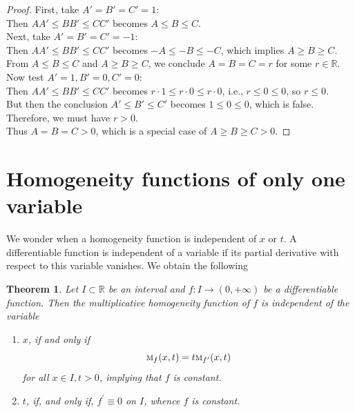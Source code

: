 \documentclass{amsart}
\newtheorem{theorem}{Theorem}
\theoremstyle{plain}
\numberwithin{equation}{section}
\newcommand{\mh}{\textsc{m}}
\newcommand{\R}{{\mathbb{R}}}
\begin{document}
\begin{proof}
First, take \(A' = B' = C' = 1\): \\
Then \(A A' \le B B' \le C C'\) becomes \(A \le B \le C\). \\

Next, take \(A' = B' = C' = -1\): \\
Then \(A A' \le B B' \le C C'\) becomes \(-A \le -B \le -C\), which implies \(A \ge B \ge C\). \\

From \(A \le B \le C\) and \(A \ge B \ge C\), we conclude \(A = B = C = r\) for some \(r \in \mathbb{R}\). \\

Now test \(A' = 1, B' = 0, C' = 0\): \\
Then \(A A' \le B B' \le C C'\) becomes \(r \cdot 1 \le r \cdot 0 \le r \cdot 0\), i.e., \(r \le 0 \le 0\), so \(r \le 0\). \\
But then the conclusion \(A' \le B' \le C'\) becomes \(1 \le 0 \le 0\), which is false. \\
Therefore, we must have \(r > 0\). \\

Thus \(A = B = C > 0\), which is a special case of \(A \ge B \ge C > 0\).
\end{proof}
\fi


\section{Homogeneity functions of only one variable}

We wonder when a homogeneity function is independent of $x$ or $t$.
A differentiable function is independent of a variable if its partial derivative with respect to this variable vanishes.
%
We obtain the following

\iffalse
\begin{theorem}
Let $I \subset \R$ be an interval and $f:I \to (0, +\infty)$ be a differentiable function.
Then the multiplicative homogeneity function of $f$ is independent of the variable
\begin{enumerate}
	\item 
	$x$, if and only if
	\begin{equation*}
	\mh_f(x,t) = t \mh_{f^\prime} (x,t)
	\label{eq:multHomIndx}
	\end{equation*}
	for all $x \in I, t>0$,
    implying that $f$ is constant.
	
	\item 
	$t$, if, and only if, $f^\prime \equiv 0$ on $I$,
     whence $f$ is constant.
\end{enumerate}
\end{theorem}
\end{document}
